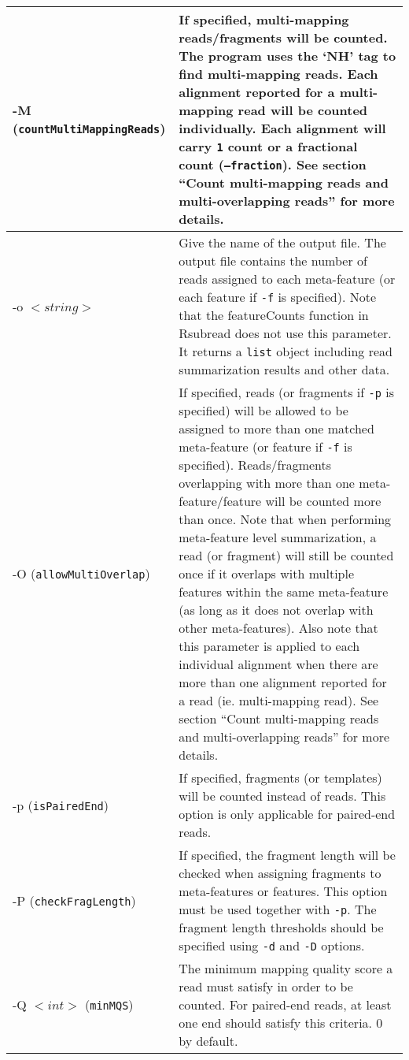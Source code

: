 \documentclass[12pt]{report}
\newcommand{\code}[1]{{\small\texttt{#1}}}
\newcommand{\Rsubread}{\textsf{Rsubread}}
\newcommand{\featureCounts}{\textsf{featureCounts}}
\begin{document}
\begin{longtable}{|p{5cm}|p{11cm}|}
\hline
-M \newline (\code{countMultiMappingReads}) & If specified, multi-mapping reads/fragments will be counted. The program uses the `NH' tag to find multi-mapping reads. Each alignment reported for a multi-mapping read will be counted individually. Each alignment will carry \code{1} count or a fractional count (\code{--fraction}). See section ``Count multi-mapping reads and multi-overlapping reads'' for more details.\\
\hline
-o $<string>$ & Give the name of the output file. The output file contains the number of reads assigned to each meta-feature (or each feature if \code{-f} is specified). Note that the {\featureCounts} function in {\Rsubread} does not use this parameter. It returns a \code{list} object including read summarization results and other data. \\
\hline
-O \newline (\code{allowMultiOverlap}) & If specified, reads (or fragments if \code{-p} is specified) will be allowed to be assigned to more than one matched meta-feature (or feature if \code{-f} is specified). Reads/fragments overlapping with more than one meta-feature/feature will be counted more than once. Note that when performing meta-feature level summarization, a read (or fragment) will still be counted once if it overlaps with multiple features within the same meta-feature (as long as it does not overlap with other meta-features). Also note that this parameter is applied to each individual alignment when there are more than one alignment reported for a read (ie. multi-mapping read). See section ``Count multi-mapping reads and multi-overlapping reads'' for more details.\\
\hline
-p \newline (\code{isPairedEnd}) & If specified, fragments (or templates) will be counted instead of reads. This option is only applicable for paired-end reads.\\
\hline
-P \newline (\code{checkFragLength}) & If specified, the fragment length will be checked when assigning fragments to meta-features or features. This option must be used together with \code{-p}. The fragment length thresholds should be specified using \code{-d} and \code{-D} options.\\
\hline
-Q $<int>$ \newline (\code{minMQS}) & The minimum mapping quality score a read must satisfy in order to be counted. For paired-end reads, at least one end should satisfy this criteria. 0 by default.\\

\end{longtable}
\end{document}
